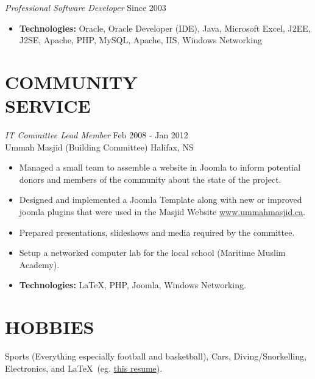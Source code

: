 \documentclass[line,margin]{res}
\begin{document}
\begin{resume}
    {\sl Professional Software Developer} \hfill Since 2003 \smallskip
        \begin{itemize}  \itemsep -2pt %
    \item {\bf Technologies:} \hspace{3pt}
        Oracle, Oracle Developer (IDE), Java, Microsoft Excel, \newline
        \hspace*{72pt} J2EE, J2SE, Apache, PHP, MySQL, Apache, IIS, \newline
        \hspace*{72pt} Windows Networking
        \end{itemize}

\section{COMMUNITY \\ SERVICE}
    {\sl IT Committee Lead Member} \hfill Feb 2008 - Jan 2012 \\
    Ummah Masjid (Building Committee) \hfill Halifax, NS \smallskip
        \begin{itemize}  \itemsep -2pt %
    \item Managed a small team to assemble a website in Joomla to inform
    potential donors and members of the community about the state of the
    project.
    \item Designed and implemented a Joomla Template along with new or
    improved joomla plugins that were used in the Masjid Website
    \href{http://www.ummahmasjid.ca}{www.ummahmasjid.ca}.
    \item Prepared presentations, slideshows and media
    required by the committee.
    \item Setup a networked computer lab for the local school (Maritime
    Muslim Academy).
    \item {\bf Technologies:} \hspace{1pt}
        \LaTeX, PHP, Joomla, Windows Networking.
        \end{itemize}

\section{HOBBIES}
    Sports (Everything especially football and basketball), Cars,
    Diving/Snorkelling, \\Electronics, and \LaTeX\ (eg. \href{https://github.com/pykler/resume}{this resume}).

\end{resume}
\end{document}
